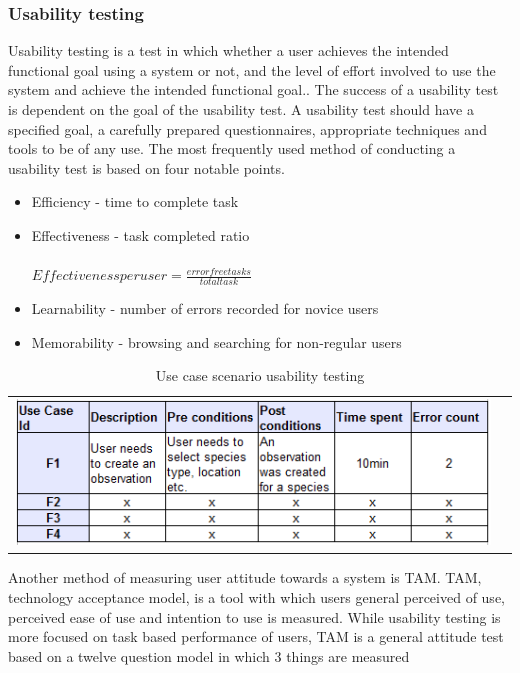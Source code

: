 \subsubsection{Usability testing}
Usability testing is a test in which whether a user achieves the intended functional goal using a system or not, and the level of effort involved to use the system and achieve the intended functional goal.\cite{iso:9126}. The success of a usability test is dependent on the goal of the usability test. A usability test should have a specified goal, a carefully prepared questionnaires, appropriate techniques and tools to be of any use. The most frequently used method of conducting a usability test is based on four notable points\cite{usability:doc2}\cite{usability:doc3}.

\begin{itemize}
\item Efficiency - time to complete task

\item Effectiveness - task completed ratio \\ \\ $Effectiveness per user=\frac{error free tasks}{total task}$
\item Learnability - number of errors recorded for novice users
\item Memorability - browsing and searching for non-regular users
\end{itemize}

\begin{table}[htb]
        \caption{Use case scenario usability testing\cite{tam:doc5}}
        \centering
        \begin{tabular}{cc}
        \includegraphics[scale=0.91]{reqspec/usabilitytable.png}
        \end{tabular}
        \label{tab:usecaseusability}
    \end{table}

Another method of measuring user attitude towards a system is TAM.
TAM, technology acceptance model, is a tool with which users general perceived of use, perceived ease of use and intention to use is measured. While usability testing is more focused on  task based performance of users\cite{tam:doc4}, TAM is a general attitude test based on a twelve question model in which 3 things are measured

